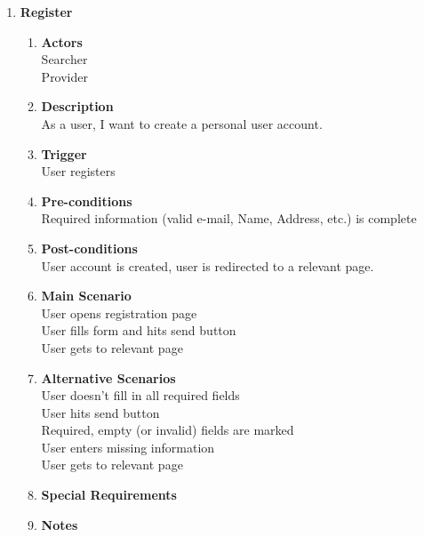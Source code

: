 \documentclass{scrreprt}
\begin{document}
\begin{enumerate}
	\item \textbf{Register}
	\begin{enumerate}
		\item \textbf{Actors}  \\
			Searcher \\
			Provider \\

		\item \textbf{Description} \\
			As a user, I want to create a personal user account. \\
			
		\item \textbf{Trigger} \\
			User registers\\

		\item \textbf{Pre-conditions} \\
			Required information (valid e-mail, Name, Address, etc.) is complete\\

		\item \textbf{Post-conditions} \\
			User account is created, user is redirected to a relevant page.\\

		\item \textbf{Main Scenario} \\
			User opens registration page \\
			User fills form and hits send button \\
			User gets to relevant page \\

		\item \textbf{Alternative Scenarios} \\
			User doesn't fill in all required fields\\
			User hits send button\\
			Required, empty (or invalid) fields are marked\\
			User enters missing information\\
			User gets to relevant page\\
		\item \textbf{Special Requirements} \\

		\item \textbf{Notes} \\
	\end{enumerate}


\end{enumerate}
\end{document}
